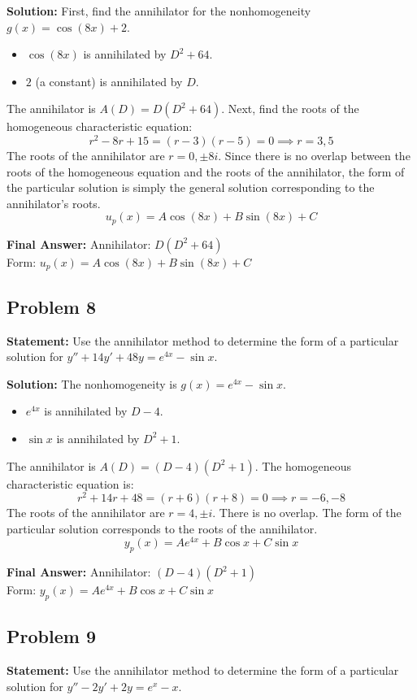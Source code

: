 \documentclass[11pt, a4paper]{article}
\theoremstyle{definition}
\theoremstyle{remark}
\begin{document}
\textbf{Solution:}
First, find the annihilator for the nonhomogeneity $g(x) = \cos(8x) + 2$.
\begin{itemize}
    \item $\cos(8x)$ is annihilated by $D^2 + 64$.
    \item $2$ (a constant) is annihilated by $D$.
\end{itemize}
The annihilator is $A(D) = D(D^2 + 64)$.
Next, find the roots of the homogeneous characteristic equation:
\[
r^2 - 8r + 15 = (r-3)(r-5) = 0 \implies r = 3, 5
\]
The roots of the annihilator are $r = 0, \pm 8i$. Since there is no overlap between the roots of the homogeneous equation and the roots of the annihilator, the form of the particular solution is simply the general solution corresponding to the annihilator's roots.
\[
u_p(x) = A \cos(8x) + B \sin(8x) + C
\]

\textbf{Final Answer:} 
Annihilator: $D(D^2 + 64)$ \\
Form: $u_p(x) = A \cos(8x) + B \sin(8x) + C$

\vspace{1em}
\subsection*{Problem 8}
\textbf{Statement:} Use the annihilator method to determine the form of a particular solution for $y'' + 14y' + 48y = e^{4x} - \sin x$.

\textbf{Solution:}
The nonhomogeneity is $g(x) = e^{4x} - \sin x$.
\begin{itemize}
    \item $e^{4x}$ is annihilated by $D-4$.
    \item $\sin x$ is annihilated by $D^2 + 1$.
\end{itemize}
The annihilator is $A(D) = (D-4)(D^2 + 1)$.
The homogeneous characteristic equation is:
\[
r^2 + 14r + 48 = (r+6)(r+8) = 0 \implies r = -6, -8
\]
The roots of the annihilator are $r = 4, \pm i$. There is no overlap. The form of the particular solution corresponds to the roots of the annihilator.
\[
y_p(x) = A e^{4x} + B \cos x + C \sin x
\]

\textbf{Final Answer:} 
Annihilator: $(D-4)(D^2 + 1)$ \\
Form: $y_p(x) = A e^{4x} + B \cos x + C \sin x$

\vspace{1em}
\subsection*{Problem 9}
\textbf{Statement:} Use the annihilator method to determine the form of a particular solution for $y'' - 2y' + 2y = e^x - x$.
\end{document}
